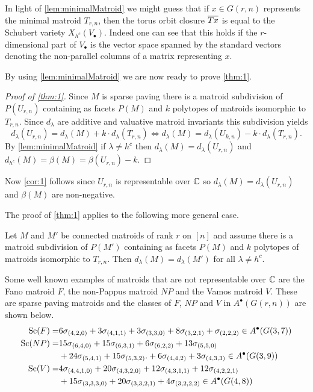\begin{remark}
\label{rmk:minimal}
    In light of \cref{lem:minimalMatroid} we might guess that if \(x \in G(r,n)\) represents the minimal matroid \(T_{r,n}\), then the torus orbit closure \({\overline{Tx}}\) is equal to the Schubert variety \(X_{h^c}(V_\bullet)\). Indeed one can see that this holds if the $r$-dimensional part of \(V_\bullet\) is the vector space spanned by the standard vectors denoting the non-parallel columns of a matrix representing \(x\).
\end{remark}

By using \cref{lem:minimalMatroid} we are now ready to prove \cref{thm:1}.
\begin{proof}[Proof of \cref{thm:1}]
    Since $M$ is sparse paving there is a matroid subdivision of $P(U_{r,n})$ containing as facets $P(M)$ and $k$ polytopes of matroids isomorphic to $T_{r,n}$. Since $d_\lambda$ are additive and valuative matroid invariants this subdivision yields
    \begin{equation*}
        d_\lambda(U_{r,n}) = d_\lambda(M) + k\cdot d_\lambda(T_{r,n}) \iff d_\lambda(M)  = d_\lambda(U_{k,n}) - k\cdot d_\lambda(T_{r,n}).
    \end{equation*}
    By \cref{lem:minimalMatroid} if $\lambda \neq h^c$ then $d_\lambda(M) = d_\lambda(U_{r,n})$ and $d_{h^c}(M) = \beta(M) = \beta(U_{r,n}) - k$.
\end{proof}
Now \cref{cor:1} follows since $U_{r,n}$ is representable over ${\mathbb C}$ so $d_\lambda(M) = d_\lambda(U_{r,n})$ and $\beta(M)$ are non-negative.

The proof of \cref{thm:1} applies to the following more general case.
\begin{corollary}
    Let $M$ and $M'$ be connected matroids of rank $r$ on $[n]$ and assume there is a matroid subdivision of $P(M')$ containing as facets $P(M)$ and $k$ polytopes of matroids isomorphic to $T_{r,n}$. Then $d_\lambda(M) = d_\lambda(M')$ for all $\lambda \neq h^c$.
\end{corollary}
\begin{example}
    Some well known examples of matroids that are not representable over ${\mathbb C}$ are the Fano matroid $F$, the non-Pappus matroid $NP$ and the Vamos matroid $V$. These are sparse paving matroids and the classes of $F$, $NP$ and $V$ in $A^\bullet(G(r,n))$ are shown below.
    \begin{align*}
        \operatorname{\mathrm{Sc}}(F) = & 6 \sigma_{(4,2,0)} + 3 \sigma_{(4,1,1)} + 3 \sigma_{(3,3,0)} + 8 \sigma_{(3,2,1)} + \sigma_{(2,2,2)} \in A^\bullet(G(3,7))\\
        \operatorname{\mathrm{Sc}}(NP) = & 15 \sigma_{(6,4,0)} + 15 \sigma_{(6,3,1)} + 6 \sigma_{(6,2,2)} + 13 \sigma_{(5,5,0)} \\
        & + 24 \sigma_{(5,4,1)} + 15 \sigma_{(5,3,2)}. + 6 \sigma_{(4,4,2)} + 3 \sigma_{(4,3,3)} \in A^\bullet(G(3,9))\\
        \operatorname{\mathrm{Sc}}(V) = & 4 \sigma_{(4,4,1,0)} + 20 \sigma_{(4,3,2,0)} + 12 \sigma_{(4,3,1,1)} + 12 \sigma_{(4,2,2,1)} \\
        & + 15 \sigma_{(3,3,3,0)} + 20 \sigma_{(3,3,2,1)} + 4 \sigma_{(3,2,2,2)} \in A^\bullet(G(4,8))
    \end{align*}
\end{example}

